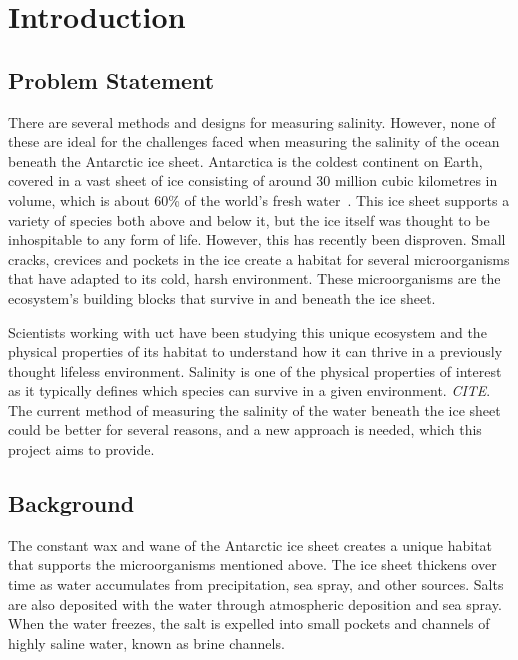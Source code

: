 
\chapter{Introduction}

\section{Problem Statement}
There are several methods and designs for measuring salinity.
However, none of these are ideal for the challenges faced when measuring the salinity of the ocean beneath the Antarctic ice sheet.
Antarctica is the coldest continent on Earth, covered in a vast sheet of ice consisting of around 30 million cubic kilometres in volume, which is about 60\% of the world's fresh water~\cite{NSIDC_ice_sheet_facts_2024}.
This ice sheet supports a variety of species both above and below it, but the ice itself was thought to be inhospitable to any form of life.
However, this has recently been disproven.
Small cracks, crevices and pockets in the ice create a habitat for several microorganisms that have adapted to its cold, harsh environment.
These microorganisms are the ecosystem's building blocks that survive in and beneath the ice sheet.

Scientists working with \gls{uct} have been studying this unique ecosystem and the physical properties of its habitat to understand how it can thrive in a previously thought lifeless environment.
Salinity is one of the physical properties of interest as it typically defines which species can survive in a given environment. \textit{CITE}.
The current method of measuring the salinity of the water beneath the ice sheet could be better for several reasons, and a new approach is needed, which this project aims to provide.

\section{Background}
The constant wax and wane of the Antarctic ice sheet creates a unique habitat that supports the microorganisms mentioned above.
The ice sheet thickens over time as water accumulates from precipitation, sea spray, and other sources.
Salts are also deposited with the water through atmospheric deposition and sea spray.
When the water freezes, the salt is expelled into small pockets and channels of highly saline water, known as brine channels.

